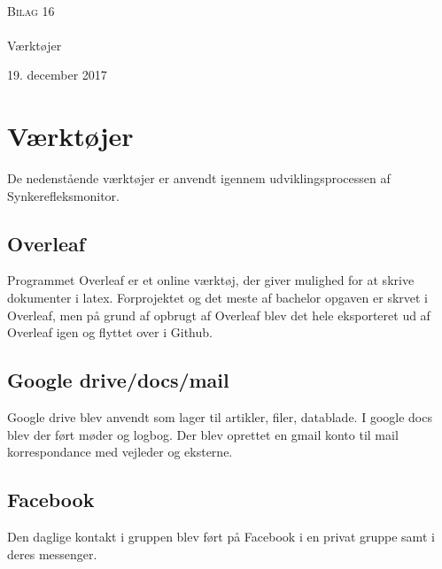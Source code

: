 

\begin{titlingpage}
\begin{center}

~ \\[3cm]

\textsc{\LARGE Bilag 16}\\[1.5cm]


\noindent\makebox[\linewidth]{\rule{\textwidth}{0.4pt}}\\
[0.5cm]{\Huge Værktøjer}
\noindent\makebox[\linewidth]{\rule{\textwidth}{0.4pt}}
\end{center}
\vfill
\begin{center}
{\large 19. december 2017}
\end{center}
\end{titlingpage}

\newpage
\tableofcontents*
\newpage

\chapter{Værktøjer}
De nedenstående værktøjer er anvendt igennem udviklingsprocessen af Synkerefleksmonitor. 

\section{Overleaf} 
Programmet Overleaf er et online værktøj, der giver mulighed for at skrive dokumenter i latex. Forprojektet og det meste af bachelor opgaven er skrvet i Overleaf, men på grund af opbrugt af Overleaf blev det hele eksporteret ud af Overleaf igen og flyttet over i Github.

\section{Google drive/docs/mail}
Google drive blev anvendt som lager til artikler, filer, datablade.
I google docs blev der ført møder og logbog. Der blev oprettet en gmail konto til mail korrespondance med vejleder og eksterne.

\section{Facebook}
Den daglige kontakt i gruppen blev ført på Facebook i en privat gruppe samt i deres messenger.

